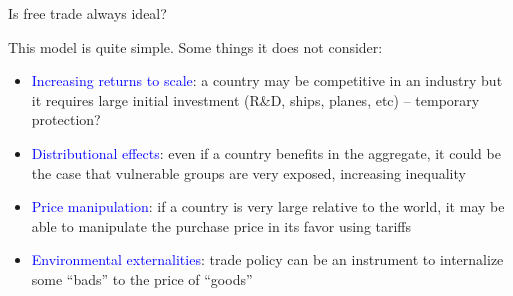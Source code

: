 \documentclass[notes,11pt, aspectratio=169, xcolor=table]{beamer}
\newcommand{\blue}[1]{\textcolor{blue}{#1}}
\newenvironment{wideitemize}{\itemize\addtolength{\itemsep}{10pt}}{\enditemize}
\begin{document}
\begin{frame}{Is free trade always ideal?}
\begin{wideitemize}
    \item This model is quite simple. Some things it does not consider:

    \begin{itemize}
        \item \blue{Increasing returns to scale}: a country may be competitive in an industry but it requires large initial investment (R\&D, ships, planes, etc) -- temporary protection?

        \item \blue{Distributional effects}: even if a country benefits in the aggregate, it could be the case that vulnerable groups are very exposed, increasing inequality

        \item \blue{Price manipulation}: if a country is very large relative to the world, it may be able to manipulate the purchase price in its favor using tariffs
        
        \item \blue{Environmental externalities}: trade policy can be an instrument to internalize some ``bads'' to the price of ``goods''
        \end{itemize}

\end{wideitemize}
    
\end{frame}
\end{document}
